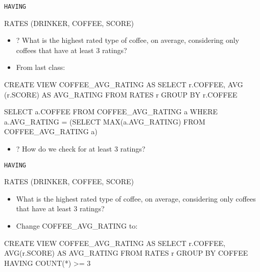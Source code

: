\documentclass[aspectratio=169]{beamer}
\newenvironment{noindentitemize}
{ \begin{itemize}
 \setlength{\itemsep}{1.5ex}
  \setlength{\parsep}{0pt}   
  \setlength{\parskip}{0pt}
 \addtolength{\leftskip}{-2em}
 }
{ \end{itemize} }
\begin{document}
\begin{frame}[fragile]{\texttt{HAVING}}

RATES (DRINKER, COFFEE, SCORE)
\begin{noindentitemize}
\item[?] What is the highest rated type of coffee, on average, considering only coffees that have at least 3 ratings?\\ 
\item From last class:
\end{noindentitemize}

\begin{SQL}
CREATE VIEW COFFEE_AVG_RATING AS
   SELECT r.COFFEE, AVG (r.SCORE) AS AVG_RATING
   FROM RATES r
   GROUP BY r.COFFEE
\end{SQL}

\begin{SQL}
SELECT a.COFFEE
FROM COFFEE_AVG_RATING a
WHERE a.AVG_RATING = (SELECT MAX(a.AVG_RATING)
                      FROM COFFEE_AVG_RATING a)
\end{SQL}
\begin{noindentitemize}
\item[?] How do we check for at least 3 ratings?
\end{noindentitemize}

\end{frame}

\begin{frame}[fragile]{\texttt{HAVING}}

RATES (DRINKER, COFFEE, SCORE)

\begin{noindentitemize}
\item What is the highest rated type of coffee, on average, considering only coffees that have at least 3 ratings?\\ 
\end{noindentitemize}
\begin{noindentitemize}
\item Change COFFEE\_AVG\_RATING to:
\end{noindentitemize}

\begin{SQL}
CREATE VIEW COFFEE_AVG_RATING AS
   SELECT r.COFFEE, AVG(r.SCORE) AS AVG_RATING
   FROM RATES r
   GROUP BY COFFEE
   HAVING COUNT(*) >= 3
\end{SQL}
\end{frame}
\end{document}
